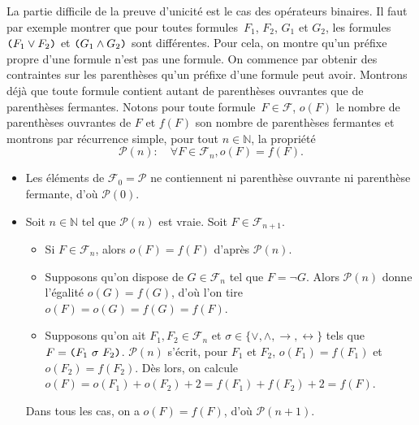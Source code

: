 \documentclass[./main]{subfiles}
\begin{document}
\begin{prv}
    La partie difficile de la preuve d'unicité est le cas des opérateurs binaires.
    Il faut par exemple montrer que pour toutes formules~$F_1$, $F_2$, $G_1$ et $G_2$, les formules ${\verb|(| F_1 \lor F_2 \verb|)|}$ et ${\verb|(| G_1 \land G_2 \verb |)|}$ sont différentes.
    Pour cela, on montre qu'un préfixe propre d'une formule n'est pas une formule.
    On commence par obtenir des contraintes sur les parenthèses qu'un préfixe d'une formule peut avoir.
    Montrons déjà que toute formule contient autant de parenthèses ouvrantes que de parenthèses fermantes.
    Notons pour toute formule~$F \in \mathcal{F}$, $o(F)$ le nombre de parenthèses ouvrantes de $F$ et $f(F)$ son nombre de parenthèses fermantes et montrons par récurrence simple, pour tout $n \in \mathds{N}$, la propriété 
    \[\mathcal{P}(n) : \quad \forall F \in \mathcal{F}_n, o(F) = f(F).\]
    \begin{itemize}
      \item Les éléments de $\mathcal{F}_0 = \mathcal{P}$ ne contiennent ni parenthèse ouvrante ni parenthèse fermante, d'où $\mathcal{P}(0)$.
      \item Soit $n \in \mathds{N}$ tel que $\mathcal{P}(n)$ est vraie.
        Soit $F \in \mathcal{F}_{n+1}$.
        \begin{itemize}
          \item Si $F \in \mathcal{F}_n$, alors $o(F) = f(F)$ d'après $\mathcal{P}(n)$.
          \item Supposons qu'on dispose de $G \in \mathcal{F}_n$ tel que $F = \lnot G$.
            Alors $\mathcal{P}(n)$ donne l'égalité $o(G) = f(G)$, d'où l'on tire $o(F) = o(G) = f(G) = f(F)$.
          \item Supposons qu'on ait $F_1, F_2 \in \mathcal{F}_n$ et $\sigma \in \{\lor, \land, \to, \leftrightarrow\}$ tels que $F = \verb|(| F_1\ \sigma\ F_2 \verb|)|$.
            $\mathcal{P}(n)$ s'écrit, pour $F_1$ et $F_2$, $o(F_1) = f(F_1)$ et $o(F_2) = f(F_2)$.
            Dès lors, on calcule $o(F) = o(F_1) + o(F_2) + 2 = f(F_1) + f(F_2) + 2 = f(F)$.
        \end{itemize}
        Dans tous les cas, on a $o(F) = f(F)$, d'où $\mathcal{P}(n+1)$.
    \end{itemize}


\end{prv}
\end{document}
